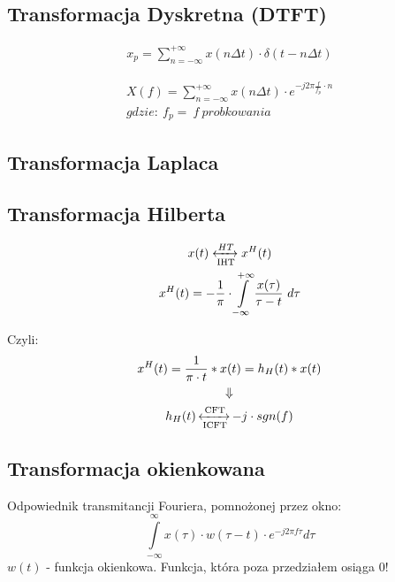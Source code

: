    \subsection{Transformacja Dyskretna (DTFT)}
         \begin{multicols}{2}
            \begin{gather*}
                x_p = \sum\limits_{n=-\infty}^{+\infty}x(n\Delta t)\cdot \delta(t-n\Delta t)
            \end{gather*}

            \begin{gather*}
                X(f) = \sum\limits_{n = -\infty}^{+\infty}x(n\Delta t) \cdot e^{-j2 \pi \frac{f}{f_{p}}\cdot n}\\
                gdzie:\ f_p =\ f\ probkowania
            \end{gather*}
         \end{multicols}

    \subsection{Transformacja Laplaca}
         

    \newpage
    \subsection{Transformacja Hilberta}
        \begin{multicols}{2}
            \begin{gather*}
                x(t) \xleftrightarrow[\text{IHT}]{HT} x^H(t)\\
                x^H(t) = -\frac{1}{\pi}  \cdot \int\limits_{-\infty}^{+\infty}\frac{x(\tau)}{\tau-t}\ d\tau
            \end{gather*}

            \noindent Czyli:
            \begin{gather*}
                x^H(t) = \frac{1}{\pi\cdot t}*x(t) = h_H(t)*x(t)\\
                \Downarrow\\
                h_H(t) \operatorname{\xleftrightarrow[\text{ICFT}]{\text{CFT}}} -j \cdot sgn(f)
            \end{gather*}
        \end{multicols}

    \subsection{Transformacja okienkowana}
        \tab Odpowiednik transmitancji Fouriera, pomnożonej przez okno:
        \begin{equation*}
            \int \limits_{-\infty}^{\infty} x(\tau) \cdot  w(\tau-t) \cdot e^{-j2\pi f \tau}d\tau
        \end{equation*}
        $w(t)$ - funkcja okienkowa. Funkcja, która poza przedziałem osiąga 0!


